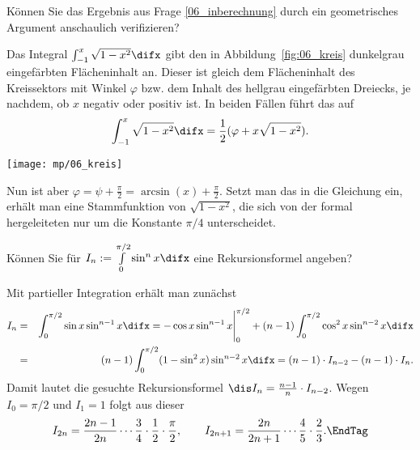 \begin{frage}
Können Sie das Ergebnis aus Frage \ref{06_inberechnung} 
durch ein geometrisches Argument anschaulich verifizieren?
\end{frage}

\begin{antwort}
 Das Integral 
$\int_{-1}^x \sqrt{1-x^2} \difx$ gibt den in 
Abbildung~\ref{fig:06_kreis} dunkelgrau eingefärbten Flächeninhalt an.
Dieser ist gleich dem Flächeninhalt des 
Kreissektors mit Winkel $\varphi$ 
 bzw.  dem Inhalt des 
hellgrau eingefärbten Dreiecks, je nachdem, ob $x$ negativ 
oder positiv ist. In beiden Fällen führt das auf
\[
\int_{-1}^x \sqrt{1-x^2} \difx = \frac{1}{2} ( \varphi + x\sqrt{1-x^2} ).
\]

\begin{center}
  \texttt{[image: mp/06\_kreis]}
  \label{fig:06_kreis}
\end{center}

Nun ist aber $\varphi=\psi+\frac{\pi}{2}=\arcsin(x)+\frac{\pi}{2}$. 
Setzt man das in die Gleichung ein, erhält man eine 
Stammfunktion von $\sqrt{1-x^2}$, die sich von der formal 
hergeleiteten nur um die Konstante $\pi/4$ unterscheidet.
\AntEnd
\end{antwort}

\begin{frage}\label{06_wallis1}
Können Sie für $
I_n := \int\limits_0^{\pi/2} \sin^n x \difx $
eine Rekursionsformel angeben?
\end{frage}

\begin{antwort}
Mit partieller Integration erhält man zunächst
\begin{eqnarray*}
I_n &=& \int_0^{\pi/2} \sin x \sin^{n-1} x \difx = 
-\cos x \sin^{n-1} x \Bigg{|}_0^{\pi/2} + 
(n-1) \int_0^{\pi/2} \cos^2 x \sin^{n-2} x \difx \\
&=& (n-1) \int_0^{\pi/2} (1-\sin^2 x) \sin^{n-2} x \difx 
= (n-1)\cdot I_{n-2} - (n-1)  \cdot I_n.
\end{eqnarray*}
Damit lautet die gesuchte Rekursionsformel 
$\dis I_n = \frac{n-1}{n} \cdot I_{n-2}$.  
Wegen $I_0 =\pi/2$ und $I_1=1$ folgt aus dieser 
\[
I_{2n} = \frac{2n-1}{2n}\cdots\frac{3}{4}\cdot\frac{1}{2}\cdot\frac{\pi}{2}, 
\qquad 
I_{2n+1} = \frac{2n}{2n+1}\cdots\frac{4}{5}\cdot\frac{2}{3}.\EndTag
\]
\end{antwort}


